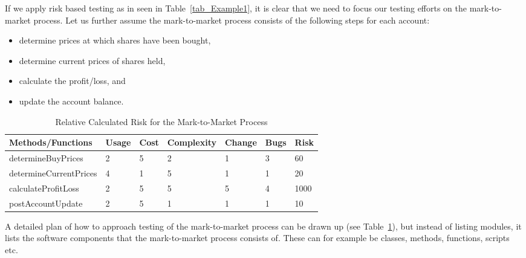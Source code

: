\documentclass{amsart}
\begin{document}
If we apply risk based testing as in seen in Table~\ref{tab_Example1}, it is clear that we need to focus our testing efforts on the mark-to-market process. Let us further assume the mark-to-market process consists of the following steps for each account:
\begin{itemize}
	\item determine prices at which shares have been bought,
	\item determine current prices of shares held,
	\item calculate the profit/loss, and
	\item update the account balance.
\end{itemize}


\begin{table}
	\footnotesize
	\begin{center} 
		\caption{Relative Calculated Risk for the Mark-to-Market Process}
		\label{tab_Example2}
		\smallskip
		\begin{tabular}{|>{\footnotesize}p{3.5cm}|>{\footnotesize}p{0.75cm}|>{\footnotesize}p{0.75cm}|>{\footnotesize}p{1.75cm}|>{\footnotesize}p{1.25cm}|>{\footnotesize}p{0.75cm}|>{\footnotesize}p{0.75cm}|}
			\hline
			\textbf{Methods/Functions} & \textbf{Usage} & \textbf{Cost} & \textbf{Complexity} & \textbf{Change} & \textbf{Bugs} & \textbf{Risk} \\
			\hline
			determineBuyPrices & 2 & 5 & 2 & 1 & 3 & 60\\
			determineCurrentPrices & 4 & 1 & 5 & 1 & 1 & 20 \\
			calculateProfitLoss & 2 & 5 & 5 & 5 & 4 & 1000\\
			postAccountUpdate & 2 & 5 & 1 & 1 & 1 & 10\\
			\hline
		\end{tabular}
	\end{center}
	\normalsize
\end{table} 


A detailed plan of how to approach testing of the mark-to-market process can be drawn up (see Table~\ref{tab_Example2}), but instead of listing modules, it lists the software components that the mark-to-market process consists of. These can for example be classes, methods, functions, scripts etc. 
\end{document}

